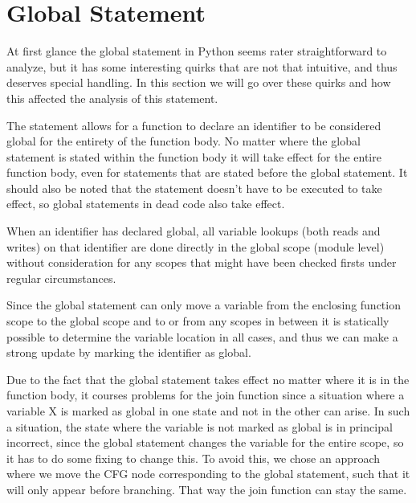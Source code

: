 \chapter{Global Statement}

At first glance the global statement in Python seems rater straightforward to analyze, but it has some interesting quirks that are not that intuitive, 
and thus deserves special handling. In this section we will go over these quirks and how this affected the analysis of this statement.

The statement allows for a function to declare an identifier to be considered global for the entirety of the function body. 
No matter where the global statement is stated within the function body it will take effect for the entire function body, 
even for statements that are stated before the global statement. It should also be noted that the statement doesn't 
have to be executed to take effect, so global statements in dead code also take effect.

When an identifier has declared global, all variable lookups (both reads and writes) on that identifier are done directly in the global scope (module level) 
without consideration for any scopes that might have been checked firsts under regular circumstances.

Since the global statement can only move a variable from the enclosing function scope to the global scope and to or from any scopes in between 
it is statically possible to determine the variable location in all cases, and thus we can make a strong update by marking the identifier as global. 

Due to the fact that the global statement takes effect no matter where it is in the function body, it courses problems for the join function 
since a situation where a variable X is marked as global in one state and not in the other can arise. In such a situation, the state where the variable is not marked as global is in principal incorrect, since the global statement changes the variable for the entire scope, so it has to do some fixing to change this. To avoid this, we chose an approach where we move the CFG node corresponding to the global statement, such that it will only appear before branching. That way the join function can stay the same.

